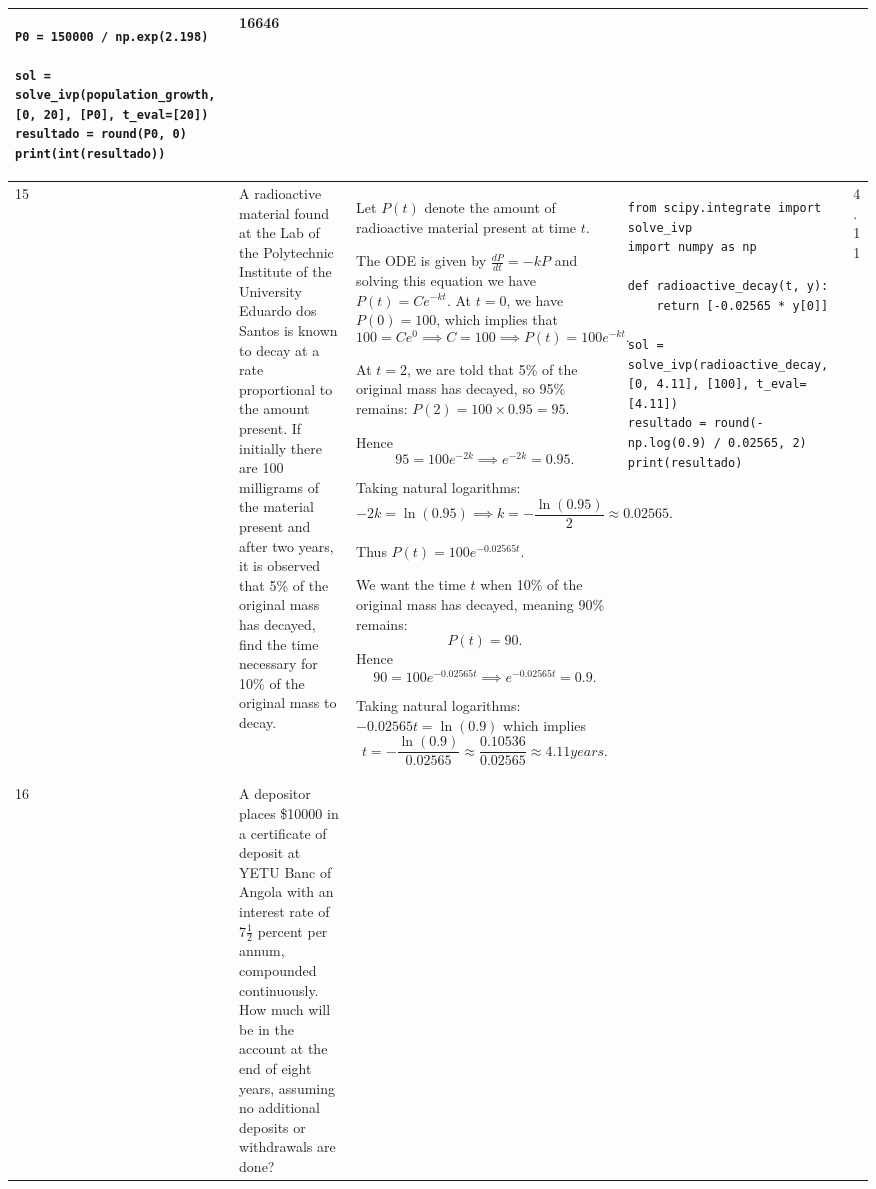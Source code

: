 \documentclass[a4paper,12pt]{article}
\begin{document}
\begin{longtable}{|p{0.3cm}|p{}|p{10cm}|p{}|p{1.5cm}|}
\begin{verbatim}
P0 = 150000 / np.exp(2.198)

sol = solve_ivp(population_growth, [0, 20], [P0], t_eval=[20])
resultado = round(P0, 0)
print(int(resultado))\end{verbatim}&    16646           \\ \hline
      15         &    A radioactive material found at the  Lab of the Polytechnic Institute of the University Eduardo dos Santos is known to decay at a rate proportional to the amount present. If initially there are 100 milligrams of the material present and after two years, it is observed that 5\% of the original mass has decayed, find the time necessary for 10\% of the original mass to decay.              &   

Let \( P(t) \) denote the amount of radioactive material present at time \( t \).

The ODE is given by $\frac{dP}{dt} = -kP$ and solving this equation we have
$P(t) = C e^{-kt}.$
At \( t = 0 \), we have \( P(0) = 100 \), which implies that
\[
100 = C e^{0} \implies C = 100 \implies P(t) = 100 e^{-kt}.
\]

At \( t = 2 \), we are told that 5\% of the original mass has decayed, so 95\% remains:
$P(2) = 100 \times 0.95 = 95.$

Hence
\[
95 = 100 e^{-2k} \implies e^{-2k} = 0.95.
\]

Taking natural logarithms:
\[
-2k = \ln(0.95) \implies k = -\frac{\ln(0.95)}{2} \approx 0.02565.
\]

Thus $P(t) = 100 e^{-0.02565t}.$

We want the time \( t \) when 10\% of the original mass has decayed, meaning 90\% remains:
\[
P(t) = 90.
\]
Hence
\[
90 = 100 e^{-0.02565t} \implies e^{-0.02565t} = 0.9.
\]

Taking natural logarithms:$
-0.02565t = \ln(0.9)$  which implies 
\[t = -\frac{\ln(0.9)}{0.02565} \approx \frac{0.10536}{0.02565} \approx 4.11  years.\]


             &\begin{verbatim}
from scipy.integrate import solve_ivp
import numpy as np

def radioactive_decay(t, y):
    return [-0.02565 * y[0]]

sol = solve_ivp(radioactive_decay, [0, 4.11], [100], t_eval=[4.11])
resultado = round(-np.log(0.9) / 0.02565, 2)
print(resultado)\end{verbatim}&   4.11            \\ \hline
     16            & A depositor places \$10000 in a certificate of deposit at YETU Banc of Angola with an interest rate of \(7\frac{1}{2}\) percent per annum, compounded continuously. How much will be in the account at the end of eight years, assuming no additional deposits or withdrawals are done? &  



\end{longtable}
\end{document}
